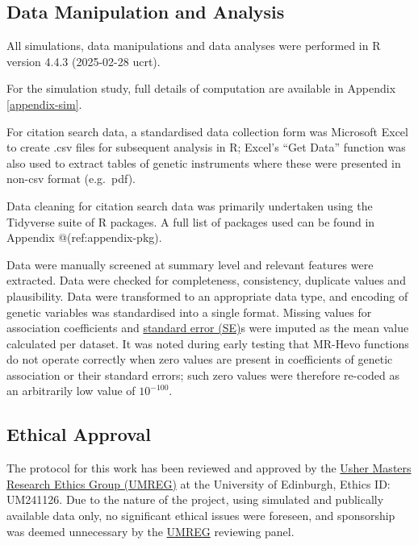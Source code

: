 \documentclass[
]{article}
\begin{document}
\subsection{Data Manipulation and Analysis}\label{data-manipulation-and-analysis}

All simulations, data manipulations and data analyses were performed in R version 4.4.3 (2025-02-28 ucrt)\textsuperscript{}.

For the simulation study, full details of computation are available in Appendix \ref{appendix-sim}.

For citation search data, a standardised data collection form was Microsoft Excel\textsuperscript{} to create .csv files for subsequent analysis in R; Excel's ``Get Data'' function was also used to extract tables of genetic instruments where these were presented in non-csv format (e.g.~pdf).

Data cleaning for citation search data was primarily undertaken using the Tidyverse suite of R packages\textsuperscript{}. A full list of packages used can be found in Appendix @(ref:appendix-pkg).

Data were manually screened at summary level and relevant features were extracted. Data were checked for completeness, consistency, duplicate values and plausibility. Data were transformed to an appropriate data type, and encoding of genetic variables was standardised into a single format. Missing values for association coefficients and \hyperref[acronyms_SE]{standard error (SE)}s were imputed as the mean value calculated per dataset. It was noted during early testing that MR-Hevo functions do not operate correctly when zero values are present in coefficients of genetic association or their standard errors; such zero values were therefore re-coded as an arbitrarily low value of \(10^{-100}\).

\subsection{Ethical Approval}\label{ethical-approval}

The protocol for this work has been reviewed and approved by the \hyperref[acronyms_UMREG]{Usher Masters Research Ethics Group (UMREG)} at the University of Edinburgh, Ethics ID: UM241126. Due to the nature of the project, using simulated and publically available data only, no significant ethical issues were foreseen, and sponsorship was deemed unnecessary by the \hyperref[acronyms_UMREG]{UMREG} reviewing panel.
\end{document}
